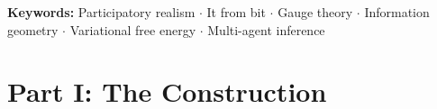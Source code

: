 \documentclass[11pt]{article}
\begin{document}
\noindent\textbf{Keywords:} Participatory realism $\cdot$ It from bit $\cdot$ Gauge theory $\cdot$ Information geometry $\cdot$ Variational free energy $\cdot$ Multi-agent inference

\clearpage
\setcounter{tocdepth}{1}
\tableofcontents
\clearpage

\part*{Part I: The Construction}
\end{document}
